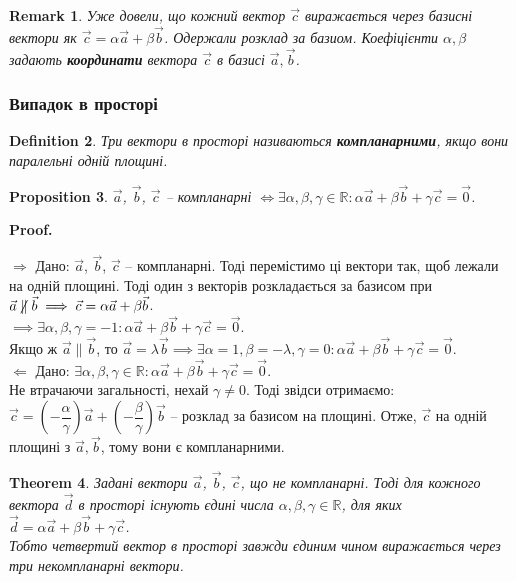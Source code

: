 \documentclass[a4paper, 10pt]{extarticle}
\makeatletter
\def\qed{$\blacksquare$}
\def\qed{$\blacksquare$}
\def\rightproof{$\boxed{\Rightarrow}$ }
\def\leftproof{$\boxed{\Leftarrow}$ }
\theoremstyle{theoremdd}
\newtheorem{theorem}{Theorem}[subsection]
\theoremstyle{theoremdd}
\newtheorem{definition}[theorem]{Definition}
\theoremstyle{theoremdd}
\theoremstyle{theoremdd}
\theoremstyle{theoremdd}
\newtheorem{proposition}[theorem]{Proposition}
\theoremstyle{theoremdd}
\newtheorem{remark}[theorem]{Remark}
\theoremstyle{theoremdd}
\theoremstyle{theoremdd}
\renewenvironment{proof}[1][Proof.\\]{\par
\pushQED{\hfill \qed}%
\normalfont \topsep6\p@\@plus6\p@\relax
\trivlist
\item\relax
{\bfseries
#1\@addpunct{.}}\hspace\labelsep\ignorespaces
}{%
\popQED\endtrivlist\@endpefalse
}
\makeatother
\begin{document}
\begin{remark}
Уже довели, що кожний вектор $\vec{c}$ виражається через базисні вектори як $\vec{c} = \alpha \vec{a} + \beta \vec{b}$. Одержали розклад за базиом. Коефіцієнти $\alpha, \beta$ задають \textbf{координати} вектора $\vec{c}$ в базисі $\vec{a},\vec{b}$.
\end{remark}
	
\subsubsection{Випадок в просторі}
\begin{definition}
Три вектори в просторі називаються \textbf{компланарними}, якщо вони паралельні одній площині.
\end{definition}

\begin{proposition}
$\vec{a}$, $\vec{b}$, $\vec{c}$ -- компланарні $\iff \exists \alpha, \beta, \gamma \in \mathbb{R}: \alpha \vec{a} + \beta \vec{b} + \gamma \vec{c} = \vec{0}$.
\end{proposition}

\begin{proof}
	\rightproof Дано: $\vec{a}$, $\vec{b}$, $\vec{c}$ -- компланарні. Тоді перемістимо ці вектори так, щоб лежали на одній площині. Тоді один з векторів розкладається за базисом при $\vec{a} \centernot\parallel \vec{b} \implies \vec{c} = \alpha \vec{a} + \beta \vec{b}$.\\
	$\implies \exists \alpha, \beta, \gamma = -1: \alpha \vec{a} + \beta \vec{b} + \gamma \vec{c} = \vec{0}$.\\
	Якщо ж $\vec{a} \parallel \vec{b}$, то $\vec{a} = \lambda \vec{b}\implies \exists \alpha = 1, \beta = -\lambda, \gamma = 0: \alpha \vec{a} + \beta \vec{b} + \gamma \vec{c} = \vec{0}$.
	\bigskip \\
	\leftproof Дано: $\exists \alpha, \beta, \gamma \in \mathbb{R}: \alpha \vec{a} + \beta \vec{b} + \gamma \vec{c} = \vec{0}$.\\
	Не втрачаючи загальності, нехай $\gamma \neq 0$. Тоді звідси отримаємо:\\
	$\vec{c} = \left( -\dfrac{\alpha}{\gamma} \right) \vec{a} + \left( -\dfrac{\beta}{\gamma} \right) \vec{b}$ -- розклад за базисом на площині. Отже, $\vec{c}$ на одній площині з $\vec{a},\vec{b}$, тому вони є компланарними.
\end{proof}

\begin{theorem}
Задані вектори $\vec{a}$, $\vec{b}$, $\vec{c}$, що не компланарні. Тоді для кожного вектора $\vec{d}$ в просторі існують єдині числа $\alpha, \beta, \gamma \in \mathbb{R}$, для яких $\vec{d} = \alpha \vec{a} + \beta \vec{b} + \gamma \vec{c}$.\\
Тобто четвертий вектор в просторі завжди єдиним чином виражається через три некомпланарні вектори.
\end{theorem}
\end{document}
